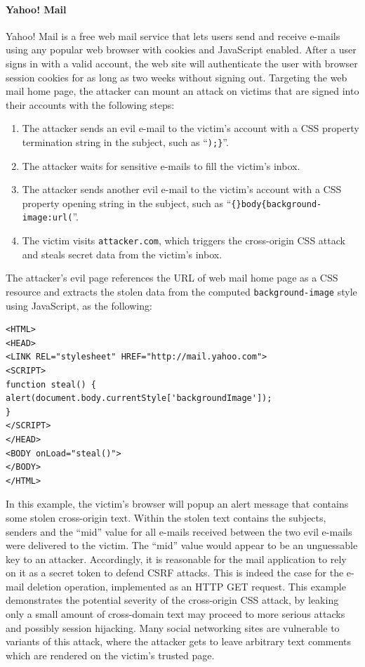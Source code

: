 \documentclass{acm_proc_article-sp}
\begin{document}
\paragraph{Yahoo! Mail} Yahoo! Mail is a free web mail service that lets users send and receive e-mails using any popular web browser with cookies and JavaScript enabled. After a user signs in with a valid account, the web site will authenticate the user with browser session cookies for as long as two weeks without signing out. Targeting the web mail home page, the attacker can mount an attack on victims that are signed into their accounts with the following steps:
\begin{enumerate}
\item{The attacker sends an evil e-mail to the victim's account with a CSS property termination string in the subject, such as ``\texttt{);\}}''.}
\item{The attacker waits for sensitive e-mails to fill the victim's inbox.}
\item{The attacker sends another evil e-mail to the victim's account with a CSS property opening string in the subject, such as ``\texttt{\{\}body\{background-image:url(}''.}
\item{The victim visits \texttt{attacker.com}, which triggers the cross-origin CSS attack and steals secret data from the victim's inbox.}
\end{enumerate}
The attacker's evil page references the URL of web mail home page as a CSS resource and extracts the stolen data from the computed \texttt{background-image} style using JavaScript, as the following:
\begin{verbatim}
<HTML>
<HEAD>
<LINK REL="stylesheet" HREF="http://mail.yahoo.com">
<SCRIPT>
function steal() {
alert(document.body.currentStyle['backgroundImage']);
}
</SCRIPT>
</HEAD>
<BODY onLoad="steal()">
</BODY>
</HTML>
\end{verbatim}
In this example, the victim's browser will popup an alert message that contains some stolen cross-origin text. Within the stolen text contains the subjects, senders and the ``mid'' value for all e-mails received between the two evil e-mails were delivered to the victim. The ``mid'' value would appear to be an unguessable key to an attacker. Accordingly, it is reasonable for the mail application to rely on it as a secret token to defend CSRF attacks. This is indeed the case for the e-mail deletion operation, implemented as an HTTP GET request. This example demonstrates the potential severity of the cross-origin CSS attack, by leaking only a small amount of cross-domain text may proceed to more serious attacks and possibly session hijacking. Many social networking sites are vulnerable to variants of this attack, where the attacker gets to leave arbitrary text comments which are rendered on the victim's trusted page.
\end{document}
